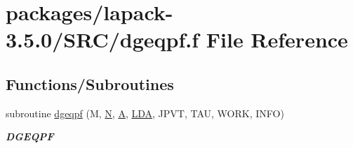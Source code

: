 \hypertarget{dgeqpf_8f}{}\section{packages/lapack-\/3.5.0/\+S\+R\+C/dgeqpf.f File Reference}
\label{dgeqpf_8f}
\subsection*{Functions/\+Subroutines}
\begin{DoxyCompactItemize}
\item 
subroutine \hyperlink{group__doubleGEcomputational_gaecad6eac294d2df861c6ae3b614c1ce8}{dgeqpf} (M, \hyperlink{polmisc_8c_a0240ac851181b84ac374872dc5434ee4}{N}, \hyperlink{classA}{A}, \hyperlink{example__user_8c_ae946da542ce0db94dced19b2ecefd1aa}{L\+D\+A}, J\+P\+V\+T, T\+A\+U, W\+O\+R\+K, I\+N\+F\+O)
\begin{DoxyCompactList}\small\item\em {\bfseries D\+G\+E\+Q\+P\+F} \end{DoxyCompactList}\end{DoxyCompactItemize}

